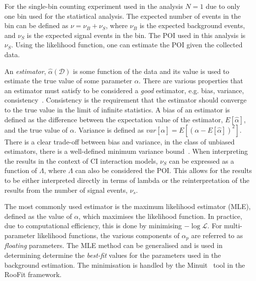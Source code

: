For the single-bin counting experiment used in the analysis $N = 1$ due to only one bin used for the statistical analysis. The expected number of events in the bin can be defined as $\nu = \nu_B +\nu_S$, where $\nu_B$ is the expected background events, and $\nu_S$ is the expected signal events in the bin. The POI used in this analysis is $\nu_S$. Using the likelihood function, one can estimate the POI given the collected data. 

An \emph{estimator}, $\hat{\alpha}(\mathcal{D})$ is some function of the data and its value is used to estimate the true value of some parameter $\alpha$. There are various properties that an estimator must satisfy to be considered a \emph{good} estimator, e.g. bias, variance, consistency~\cite{errorsOnNumbers}. Consistency is the requirement that the estimator should converge to the true value in the limit of infinite statistics. A bias of an estimator is defined as the difference between the expectation value of the estimator, $E[\hat{\alpha}]$, and the true value of $\alpha$. Variance is defined as $var[\hat{\alpha}] = E\left[(\alpha - E[\hat{\alpha}])^{2}\right]$. There is a clear trade-off between bias and variance, in the class of unbiased estimators, there is a well-defined minimum variance bound~\cite{Cranmer:2015nia}. When interpreting the results in the context of CI interaction models, $\nu_S$ can be expressed as a function of $\Lambda$, where $\Lambda$ can also be considered the POI. This allows for the results to be either interpreted directly in terms of lambda or the reinterpretation of the results from  the number of signal events, $\nu_s$.

The most commonly used estimator is the maximum likelihood estimator (MLE), defined as the value of $\alpha$, which maximises the likelihood function. In practice, due to computational efficiency, this is done by minimising $-\log\mathcal{L}$. For multi-parameter likelihood functions, the various components of $\alpha_p$ are referred to as \emph{floating} parameters. The MLE method can be generalised and is used in determining determine the \emph{best-fit} values for the parameters used in the background estimation. The minimisation is handled by the Minuit~\cite{James:873119} tool in the RooFit framework.

